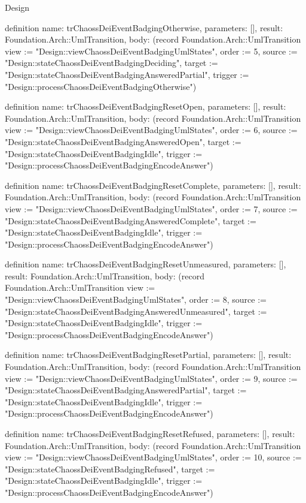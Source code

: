 \begin{lexlean}{Design}
\begin{semanticmodule}
definition{
  name: trChaossDeiEventBadgingOtherwise,
  parameters: [],
  result: Foundation.Arch::UmlTransition,
  body: (record Foundation.Arch::UmlTransition {view := "Design::viewChaossDeiEventBadgingUmlStates", order := 5, source := "Design::stateChaossDeiEventBadgingDeciding", target := "Design::stateChaossDeiEventBadgingAnsweredPartial", trigger := "Design::processChaossDeiEventBadgingOtherwise"})
}

definition{
  name: trChaossDeiEventBadgingResetOpen,
  parameters: [],
  result: Foundation.Arch::UmlTransition,
  body: (record Foundation.Arch::UmlTransition {view := "Design::viewChaossDeiEventBadgingUmlStates", order := 6, source := "Design::stateChaossDeiEventBadgingAnsweredOpen", target := "Design::stateChaossDeiEventBadgingIdle", trigger := "Design::processChaossDeiEventBadgingEncodeAnswer"})
}

definition{
  name: trChaossDeiEventBadgingResetComplete,
  parameters: [],
  result: Foundation.Arch::UmlTransition,
  body: (record Foundation.Arch::UmlTransition {view := "Design::viewChaossDeiEventBadgingUmlStates", order := 7, source := "Design::stateChaossDeiEventBadgingAnsweredComplete", target := "Design::stateChaossDeiEventBadgingIdle", trigger := "Design::processChaossDeiEventBadgingEncodeAnswer"})
}

definition{
  name: trChaossDeiEventBadgingResetUnmeasured,
  parameters: [],
  result: Foundation.Arch::UmlTransition,
  body: (record Foundation.Arch::UmlTransition {view := "Design::viewChaossDeiEventBadgingUmlStates", order := 8, source := "Design::stateChaossDeiEventBadgingAnsweredUnmeasured", target := "Design::stateChaossDeiEventBadgingIdle", trigger := "Design::processChaossDeiEventBadgingEncodeAnswer"})
}

definition{
  name: trChaossDeiEventBadgingResetPartial,
  parameters: [],
  result: Foundation.Arch::UmlTransition,
  body: (record Foundation.Arch::UmlTransition {view := "Design::viewChaossDeiEventBadgingUmlStates", order := 9, source := "Design::stateChaossDeiEventBadgingAnsweredPartial", target := "Design::stateChaossDeiEventBadgingIdle", trigger := "Design::processChaossDeiEventBadgingEncodeAnswer"})
}

definition{
  name: trChaossDeiEventBadgingResetRefused,
  parameters: [],
  result: Foundation.Arch::UmlTransition,
  body: (record Foundation.Arch::UmlTransition {view := "Design::viewChaossDeiEventBadgingUmlStates", order := 10, source := "Design::stateChaossDeiEventBadgingRefused", target := "Design::stateChaossDeiEventBadgingIdle", trigger := "Design::processChaossDeiEventBadgingEncodeAnswer"})
}


\end{semanticmodule}
\end{lexlean}
